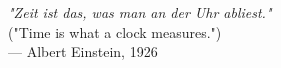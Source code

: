 \begin{flushright}
\emph{"Zeit ist das, was man an der Uhr abliest."} \\
("Time is what a clock measures.") \\
— Albert Einstein, 1926
\end{flushright}
